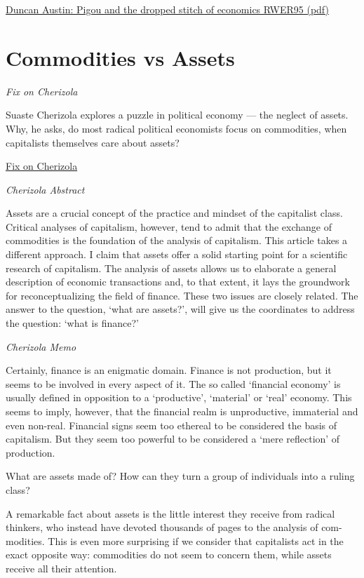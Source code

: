 \documentclass[
]{book}
\begin{document}
\href{pdf/Austin_2021_Pigou_\%20and_the_dropped_stitch_of_economics_RWER95.pdf}{Duncan Austin: Pigou and the dropped stitch of economics RWER95 (pdf)}

\hypertarget{commodities-vs-assets}{%
\section{Commodities vs Assets}\label{commodities-vs-assets}}

\emph{Fix on Cherizola}

Suaste Cherizola explores a puzzle in political economy --- the neglect of assets. Why, he asks, do most radical political economists focus on commodities, when capitalists themselves care about assets?

\href{https://economicsfromthetopdown.com/2021/05/03/jesus-suaste-cherizola-wins-the-2021-casp-essay-prize/}{Fix on Cherizola}

\emph{Cherizola Abstract}

Assets are a crucial concept of the practice and mindset of the capitalist class. Critical analyses of capitalism, however, tend to admit that the exchange of commodities is the foundation of the analysis of capitalism. This article takes a different approach. I claim that assets offer a solid starting point for a scientific research of capitalism. The analysis of assets allows us to elaborate a general description of economic transactions and, to that extent, it lays the groundwork for reconceptualizing the field of finance. These two issues are closely related. The answer to the question, `what are assets?', will give us the coordinates to address the question: `what is finance?'

\emph{Cherizola Memo}

Certainly, finance is an enigmatic domain. Finance is not production, but it
seems to be involved in every aspect of it. The so called `financial economy' is
usually defined in opposition to a `productive', `material' or `real' economy. This
seems to imply, however, that the financial realm is unproductive, immaterial
and even non-real. Financial signs seem too ethereal to be considered the basis
of capitalism. But they seem too powerful to be considered a `mere reflection'
of production.

What are assets made of? How can they turn a
group of individuals into a ruling class?

A remarkable fact about assets is the little interest they receive from radical
thinkers, who instead have devoted thousands of pages to the analysis of com-
modities. This is even more surprising if we consider that capitalists act in the
exact opposite way: commodities do not seem to concern them, while assets
receive all their attention.
\end{document}
